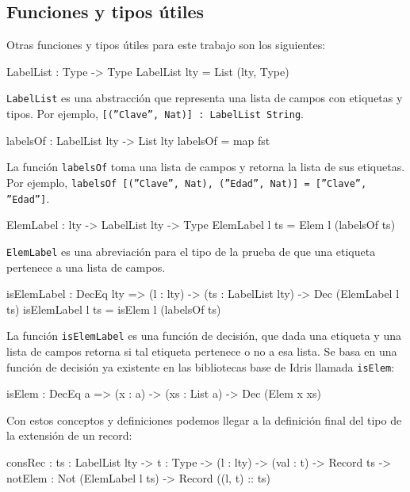 \subsection{Funciones y tipos útiles}

Otras funciones y tipos útiles para este trabajo son los siguientes:

\begin{code}
LabelList : Type -> Type
LabelList lty = List (lty, Type)
\end{code}

\texttt{LabelList} es una abstracción que representa una lista de campos con etiquetas y tipos. Por ejemplo, \texttt{[(''Clave'', Nat)] : LabelList String}.

\begin{code}
labelsOf : LabelList lty -> List lty
labelsOf = map fst
\end{code}

La función \texttt{labelsOf} toma una lista de campos y retorna la lista de sus etiquetas. Por ejemplo, \texttt{labelsOf [(''Clave'', Nat), (''Edad'', Nat)] = [''Clave'', ''Edad'']}.

\begin{code}
ElemLabel : lty -> LabelList lty -> Type
ElemLabel l ts = Elem l (labelsOf ts)
\end{code}

\texttt{ElemLabel} es una abreviación para el tipo de la prueba de que una etiqueta pertenece a una lista de campos.

\begin{code}
isElemLabel : DecEq lty => (l : lty) ->
  (ts : LabelList lty) ->
  Dec (ElemLabel l ts)
isElemLabel l ts = isElem l (labelsOf ts)
\end{code}

La función \texttt{isElemLabel} es una función de decisión, que dada una etiqueta y una lista de campos retorna si tal etiqueta pertenece o no a esa lista. Se basa en una función de decisión ya existente en las bibliotecas base de Idris llamada \texttt{isElem}:

\begin{code}
isElem : DecEq a => (x : a) -> (xs : List a) ->
  Dec (Elem x xs)
\end{code}

Con estos conceptos y definiciones podemos llegar a la definición final del tipo de la extensión de un record:

\begin{code}
consRec : {ts : LabelList lty} ->
  {t : Type} -> (l : lty) -> (val : t) ->
  Record ts -> {notElem : Not (ElemLabel l ts)} ->
  Record ((l, t) :: ts)
\end{code}

